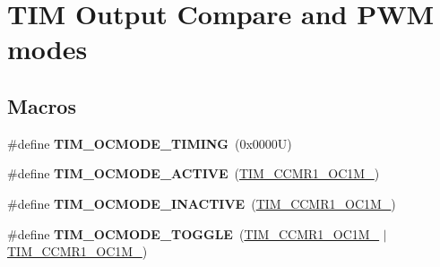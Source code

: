 \hypertarget{group___t_i_m___output___compare__and___p_w_m__modes}{}\section{T\+IM Output Compare and P\+WM modes}
\label{group___t_i_m___output___compare__and___p_w_m__modes}
\subsection*{Macros}
\begin{DoxyCompactItemize}
\item 
\mbox{\label{group___t_i_m___output___compare__and___p_w_m__modes_gafae6b98b4b854fbfffd9a5ebc59c8f61}} 
\#define {\bfseries T\+I\+M\+\_\+\+O\+C\+M\+O\+D\+E\+\_\+\+T\+I\+M\+I\+NG}~(0x0000\+U)
\item 
\mbox{\label{group___t_i_m___output___compare__and___p_w_m__modes_ga111d1023e3ac6ef5544775c3863b4b12}} 
\#define {\bfseries T\+I\+M\+\_\+\+O\+C\+M\+O\+D\+E\+\_\+\+A\+C\+T\+I\+VE}~(\hyperlink{group___peripheral___registers___bits___definition_ga410a4752a98081bad8ab3f72b28e7c5f}{T\+I\+M\+\_\+\+C\+C\+M\+R1\+\_\+\+O\+C1\+M\+\_})
\item 
\mbox{\label{group___t_i_m___output___compare__and___p_w_m__modes_ga890fbb44fd16f2bce962983352d23f53}} 
\#define {\bfseries T\+I\+M\+\_\+\+O\+C\+M\+O\+D\+E\+\_\+\+I\+N\+A\+C\+T\+I\+VE}~(\hyperlink{group___peripheral___registers___bits___definition_ga8b5f6ec25063483641d6dc065d96d2b5}{T\+I\+M\+\_\+\+C\+C\+M\+R1\+\_\+\+O\+C1\+M\+\_})
\item 
\mbox{\label{group___t_i_m___output___compare__and___p_w_m__modes_ga368f80fad76018e2bf76084522e47536}} 
\#define {\bfseries T\+I\+M\+\_\+\+O\+C\+M\+O\+D\+E\+\_\+\+T\+O\+G\+G\+LE}~(\hyperlink{group___peripheral___registers___bits___definition_ga410a4752a98081bad8ab3f72b28e7c5f}{T\+I\+M\+\_\+\+C\+C\+M\+R1\+\_\+\+O\+C1\+M\+\_} $\vert$ \hyperlink{group___peripheral___registers___bits___definition_ga8b5f6ec25063483641d6dc065d96d2b5}{T\+I\+M\+\_\+\+C\+C\+M\+R1\+\_\+\+O\+C1\+M\+\_})

\end{DoxyCompactItemize}
